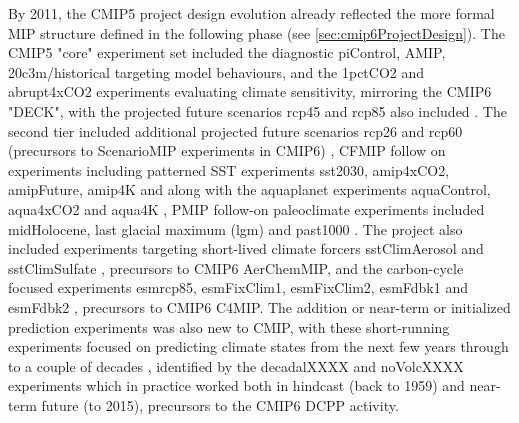 \documentclass[gmd, preprint]{copernicus}
\newcommand{\mycomment}[1]{}
\begin{document}
By 2011, the CMIP5 project design evolution already reflected the more formal MIP structure defined in the following phase (see \autoref{sec:cmip6ProjectDesign}). The CMIP5 "core" experiment set included the diagnostic piControl, AMIP, 20c3m/historical targeting model behaviours, and the 1pctCO2 and abrupt4xCO2 experiments evaluating climate sensitivity, mirroring the CMIP6 "DECK", with the projected future scenarios rcp45 and rcp85 also included \citep{stouffer_cmip5_2011}. The second tier included additional projected future scenarios rcp26 and rcp60 (precursors to ScenarioMIP experiments in CMIP6) \citep{hibbard_primer_2011}, CFMIP follow on experiments including patterned SST experiments sst2030, amip4xCO2, amipFuture, amip4K and along with the aquaplanet experiments aquaControl, aqua4xCO2 and aqua4K \citep{bony_cfmip_2011}, PMIP follow-on paleoclimate experiments included midHolocene, last glacial maximum (lgm) and past1000 \citep{braconnot_paleoclimate_2011}. The project also included experiments targeting short-lived climate forcers sstClimAerosol and sstClimSulfate \citep{boucher_climate_2011}, precursors to CMIP6 AerChemMIP, and the carbon-cycle focused experiments esmrcp85, esmFixClim1, esmFixClim2, esmFdbk1 and esmFdbk2 \citep{friedlingstein_climate-carbon_2011}, precursors to CMIP6 C4MIP. The addition or near-term or initialized prediction experiments was also new to CMIP, with these short-running experiments focused on predicting climate states from the next few years through to a couple of decades \citep{doblas-reyes_cmip5_2011}, identified by the decadalXXXX and noVolcXXXX experiments which in practice worked both in hindcast (back to 1959) and near-term future (to 2015), precursors to the CMIP6 DCPP activity.

\mycomment{
Map CMIP5 experiments to CMIP6 MIPs
https://github.com/PCMDI/CMIP5_CVs/blob/main/src/writeJson.py
https://docs.google.com/document/d/1bUwK6G_fVZO53UjLZbQUOuBP47PsT8lqKKhL1pjRnKg/edit
}
\end{document}
